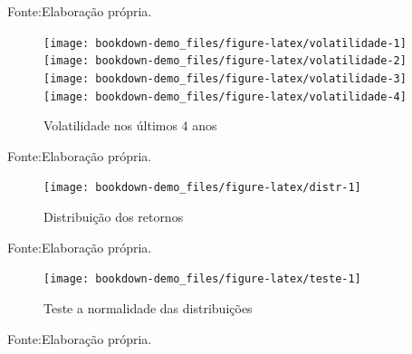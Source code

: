 \documentclass[
  12pt,
  a4paper,
  openany]{book}
\begin{document}
Fonte:Elaboração própria.

\justifying
\bigskip
\begin{figure}

{\centering \texttt{[image: bookdown-demo\_files/figure-latex/volatilidade-1]} \texttt{[image: bookdown-demo\_files/figure-latex/volatilidade-2]} \texttt{[image: bookdown-demo\_files/figure-latex/volatilidade-3]} \texttt{[image: bookdown-demo\_files/figure-latex/volatilidade-4]} 

}

\caption{Volatilidade nos últimos 4 anos}\label{fig:volatilidade}
\end{figure}
\FloatBarrier
\centering

Fonte:Elaboração própria.

\justifying
\bigskip
\begin{figure}

{\centering \texttt{[image: bookdown-demo\_files/figure-latex/distr-1]} 

}

\caption{Distribuição dos retornos}\label{fig:distr}
\end{figure}
\FloatBarrier
\centering

Fonte:Elaboração própria.

\justifying
\bigskip
\begin{figure}

{\centering \texttt{[image: bookdown-demo\_files/figure-latex/teste-1]} 

}

\caption{Teste a normalidade das distribuições}\label{fig:teste}
\end{figure}
\FloatBarrier
\centering

Fonte:Elaboração própria.

\justifying
\bigskip
\begin{table}[!h]

\caption{\label{tab:unnamed-chunk-10}Teste normalidade Shapiro-Wilk}
\centering
{}
\end{table}
\FloatBarrier
\centering
\end{document}

